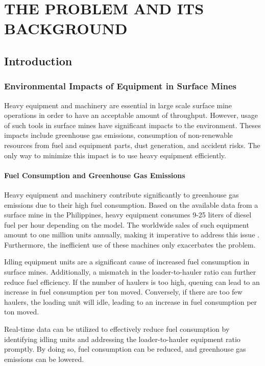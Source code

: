 \documentclass[12pt]{report}
\begin{document}
\chapter{THE PROBLEM AND ITS BACKGROUND}


\section{Introduction}

\subsection{Environmental Impacts of Equipment in Surface Mines}

Heavy equipment and machinery are essential in large scale surface mine operations in order to have an acceptable amount of throughput.
However, usage of such tools in surface mines have significant impacts to the environment.
Theses impacts include greenhouse gas emissions, consumption of non-renewable resources from fuel and equipment parts, dust generation, and accident risks.
The only way to minimize this impact is to use heavy equipment efficiently.

\subsubsection{Fuel Consumption and Greenhouse Gas Emissions}

Heavy equipment and machinery contribute significantly to greenhouse gas emissions due to their high fuel consumption.
Based on the available data from a surface mine in the Philippines, heavy equipment consumes 9-25 liters of diesel fuel per hour depending on the model.
The worldwide sales of such equipment amount to one million units annually, making it imperative to address this issue \cite{EquipmentFuelOptimization}.
Furthermore, the inefficient use of these machines only exacerbates the problem.

Idling equipment units are a significant cause of increased fuel consumption in surface mines.
Additionally, a mismatch in the loader-to-hauler ratio can further reduce fuel efficiency.
If the number of haulers is too high, queuing can lead to an increase in fuel consumption per ton moved.
Conversely, if there are too few haulers, the loading unit will idle, leading to an increase in fuel consumption per ton moved.

Real-time data can be utilized to effectively reduce fuel consumption by identifying idling units and addressing the loader-to-hauler equipment ratio promptly.
By doing so, fuel consumption can be reduced, and greenhouse gas emissions can be lowered.
\end{document}
